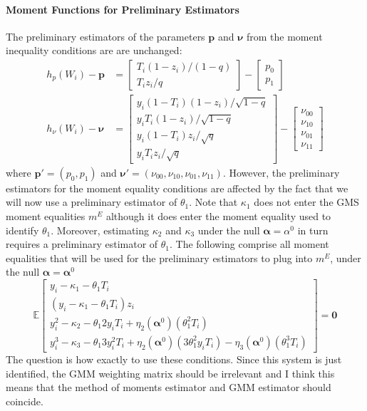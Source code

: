 \documentclass[12pt]{article}
\begin{document}
\paragraph{Moment Functions for Preliminary Estimators}
The preliminary estimators of the parameters $\mathbf{p}$ and $\mathbf{\nu}$ from the moment inequality conditions are are unchanged:
\begin{align*}
h_p(W_i) - \mathbf{p} &= \left[
\begin{array}{l}
  T_i (1-z_i)/(1-q)\\ 
  T_i z_i / q 
\end{array}
\right] - \left[
\begin{array}{c}
  p_0 \\ p_1
\end{array}
\right]\\
h_\nu(W_i) - \boldsymbol{\nu} &= \left[
\begin{array}{l}
  y_i (1 - T_i) (1-z_i) / \sqrt{1-q}\\ 
  y_i T_i (1-z_i) / \sqrt{1-q} \\
  y_i (1 - T_i) z_i / \sqrt{q} \\
  y_i T_i z_i/\sqrt{q} 
\end{array}
\right] - \left[
\begin{array}{c}
  \nu_{00} \\
  \nu_{10} \\
  \nu_{01} \\
  \nu_{11} 
\end{array}
\right]
\end{align*}
where $\mathbf{p}'= (p_0, p_1)$ and $\boldsymbol{\nu}' = (\nu_{00}, \nu_{10}, \nu_{01}, \nu_{11})$.
However, the preliminary estimators for the moment equality conditions are affected by the fact that we will now use a preliminary estimator of $\theta_1$.
Note that $\kappa_1$ does not enter the GMS moment equalities $m^E$ although it does enter the moment equality used to identify $\theta_1$.
Moreover, estimating $\kappa_2$ and $\kappa_3$ under the null $\mathbf{\alpha} = \alpha^0$ in turn requires a preliminary estimator of $\theta_1$.
The following comprise all moment equalities that will be used for the preliminary estimators to plug into $m^E$, under the null $\boldsymbol{\alpha} = \boldsymbol{\alpha}^0$
\[
  \mathbb{E} 
  \left[
  \begin{array}{l}
 y_i - \kappa_1 - \theta_1 T_i\\
 (y_i - \kappa_1 - \theta_1 T_i)z_i\\
  y_i^2 - \kappa_2 - \theta_1 2y_i T_i + \eta_2(\boldsymbol{\alpha}^0) (\theta_1^2 T_i) \\
 y_i^3 - \kappa_3 - \theta_1 3 y_i^2 T_i +  \eta_2(\boldsymbol{\alpha}^0)(3\theta_1^2y_iT_i) -  \eta_3(\boldsymbol{\alpha}^0)(\theta_1^3 T_i)
  \end{array}
\right] = \mathbf{0}
\]
The question is how exactly to use these conditions.
Since this system is just identified, the GMM weighting matrix should be irrelevant and I think this means that the method of moments estimator and GMM estimator should coincide.
\end{document}
